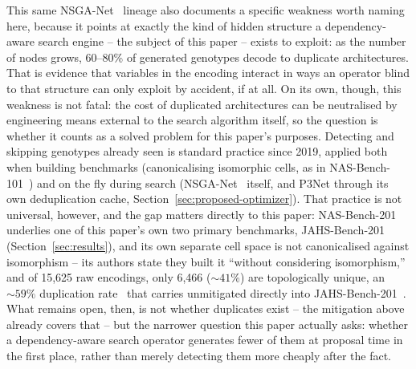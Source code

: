 This same NSGA-Net~\citep{lu2019nsganet} lineage also documents a specific weakness worth naming here, because it points at exactly the kind of hidden structure a dependency-aware search engine -- the subject of this paper -- exists to exploit: as the number of nodes grows, 60--80\% of generated genotypes decode to duplicate architectures. That is evidence that variables in the encoding interact in ways an operator blind to that structure can only exploit by accident, if at all. On its own, though, this weakness is not fatal: the cost of duplicated architectures can be neutralised by engineering means external to the search algorithm itself, so the question is whether it counts as a solved problem for this paper's purposes. Detecting and skipping genotypes already seen is standard practice since 2019, applied both when building benchmarks (canonicalising isomorphic cells, as in NAS-Bench-101~\citep{ying2019nasbench101}) and on the fly during search (NSGA-Net~\citep{lu2019nsganet} itself, and P3Net through its own deduplication cache, Section~\ref{sec:proposed-optimizer}). That practice is not universal, however, and the gap matters directly to this paper: NAS-Bench-201~\citep{dong2020nasbench201} underlies one of this paper's own two primary benchmarks, JAHS-Bench-201~\citep{bansal2022jahsbench} (Section~\ref{sec:results}), and its own separate cell space is not canonicalised against isomorphism -- its authors state they built it ``without considering isomorphism,'' and of 15,625 raw encodings, only 6,466 (${\sim}41\%$) are topologically unique, an ${\sim}59\%$ duplication rate~\citep{dong2020nasbench201} that carries unmitigated directly into JAHS-Bench-201~\citep{bansal2022jahsbench}. What remains open, then, is not whether duplicates exist -- the mitigation above already covers that -- but the narrower question this paper actually asks: whether a dependency-aware search operator generates fewer of them at proposal time in the first place, rather than merely detecting them more cheaply after the fact.

